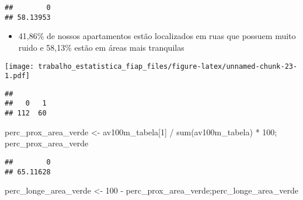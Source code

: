 \documentclass[
]{article}
\newenvironment{Shaded}{\begin{snugshade}}{\end{snugshade}}
\newcommand{\AttributeTok}[1]{\textcolor[rgb]{0.77,0.63,0.00}{#1}}
\newcommand{\DecValTok}[1]{\textcolor[rgb]{0.00,0.00,0.81}{#1}}
\newcommand{\FunctionTok}[1]{\textcolor[rgb]{0.00,0.00,0.00}{#1}}
\newcommand{\NormalTok}[1]{#1}
\newcommand{\OtherTok}[1]{\textcolor[rgb]{0.56,0.35,0.01}{#1}}
\newcommand{\SpecialCharTok}[1]{\textcolor[rgb]{0.00,0.00,0.00}{#1}}
\providecommand{\tightlist}{%
  \setlength{\itemsep}{0pt}\setlength{\parskip}{0pt}}
\begin{document}
\begin{verbatim}
##        0 
## 58.13953
\end{verbatim}

\begin{itemize}
\tightlist
\item
  41,86\% de nossos apartamentos estão localizados em ruas que possuem
  muito ruido e 58,13\% estão em áreas mais tranquilas
\end{itemize}

\begin{Shaded}
\end{Shaded}

\texttt{[image: trabalho\_estatistica\_fiap\_files/figure-latex/unnamed-chunk-23-1.pdf]}

\begin{Shaded}
\end{Shaded}

\begin{verbatim}
## 
##   0   1 
## 112  60
\end{verbatim}

\begin{Shaded}
\begin{Highlighting}[]
\NormalTok{perc\_prox\_area\_verde }\OtherTok{\textless{}{-}}\NormalTok{ av100m\_tabela[}\DecValTok{1}\NormalTok{] }\SpecialCharTok{/} \FunctionTok{sum}\NormalTok{(av100m\_tabela) }\SpecialCharTok{*} \DecValTok{100}\NormalTok{; perc\_prox\_area\_verde}
\end{Highlighting}
\end{Shaded}

\begin{verbatim}
##        0 
## 65.11628
\end{verbatim}

\begin{Shaded}
\begin{Highlighting}[]
\NormalTok{perc\_longe\_area\_verde }\OtherTok{\textless{}{-}} \DecValTok{100} \SpecialCharTok{{-}}\NormalTok{ perc\_prox\_area\_verde;perc\_longe\_area\_verde}
\end{Highlighting}
\end{Shaded}
\end{document}

